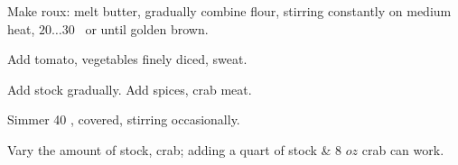 \begin{preparation}
\item Make roux: melt butter, gradually combine flour, stirring constantly on medium heat, $20\ldots30$
    \minute~or until golden brown.

\item Add tomato, vegetables finely diced, sweat.

\item Add stock gradually. Add spices, crab meat.

\item Simmer 40 \minute, covered, stirring occasionally.
\end{preparation}

\begin{experiments}
\item Vary the amount of stock, crab; adding a quart of stock \& 8 $oz$ crab can work.
\end{experiments}

\recipeend%
